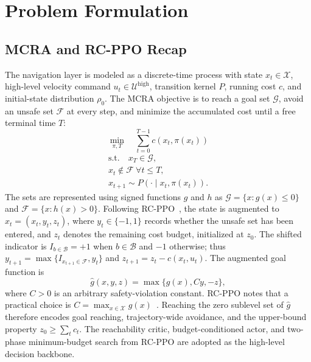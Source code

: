 \documentclass[conference]{IEEEtran}
\begin{document}
\section{Problem Formulation}
\label{sec:problem_setup}
\subsection{MCRA and RC-PPO Recap}
The navigation layer is modeled as a discrete-time process with state $x_t\in
\mathcal{X}$, high-level velocity command $u_t\in\mathcal{U}^{\mathrm{high}}$,
transition kernel $P$, running cost $c$, and initial-state distribution $\rho_0$.
The MCRA objective is to reach a goal set $\mathcal{G}$, avoid an unsafe set
$\mathcal{F}$ at every step, and minimize the accumulated cost until a free terminal
time $T$:
\begin{equation}
\min_{\pi,T}\quad \sum_{t=0}^{T-1}c(x_t,\pi(x_t))
\label{eq:mcra_objective}
\end{equation}
\begin{equation}
\begin{gathered}
\mathrm{s.t.}\quad x_T\in\mathcal{G},\\
x_t\notin\mathcal{F}\ \forall t\leq T,\\
x_{t+1}\sim P(\cdot\mid x_t,\pi(x_t)).
\end{gathered}
\label{eq:mcra_constraints}
\end{equation}
The sets are represented using signed functions $g$ and $h$ as
$\mathcal{G}=\{x:g(x)\leq0\}$ and $\mathcal{F}=\{x:h(x)>0\}$. Following
RC-PPO~\cite{so2024}, the state is augmented to $\hat{x}_t=(x_t,y_t,z_t)$,
where $y_t\in\{-1,1\}$ records whether the unsafe set has been entered, and $z_t$
denotes the remaining cost budget, initialized at $z_0$. The shifted indicator is
$I_{b\in\mathcal{B}}=+1$ when $b\in\mathcal{B}$ and $-1$ otherwise; thus
$y_{t+1}=\max\{I_{x_{t+1}\in\mathcal{F}},y_t\}$ and
$z_{t+1}=z_t-c(x_t,u_t)$. The augmented goal function is
\begin{equation}
\hat{g}(x,y,z)=\max\{g(x),Cy,-z\},
\label{eq:augmented_goal}
\end{equation}
where $C>0$ is an arbitrary safety-violation constant. RC-PPO notes that a
practical choice is $C=\max_{x\in\mathcal{X}}g(x)$~\cite{so2024}. Reaching the
zero sublevel set of $\hat{g}$ therefore encodes goal reaching, trajectory-wide
avoidance, and the upper-bound property $z_0\geq\sum_t c_t$. The reachability critic,
budget-conditioned actor, and two-phase minimum-budget search from RC-PPO are
adopted as the high-level decision backbone.
\end{document}

